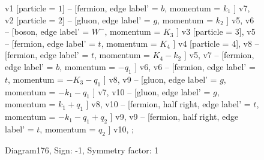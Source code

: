 \documentclass{revtex4}
\begin{document}
\begin{figure}[!htb]
\begin{center}
{    %
v1 [particle = \(1\)] -- [fermion, edge label' = \(b\), momentum = \(k_{1}\) ] v7, 
v2 [particle = \(2\)] -- [gluon, edge label' = \(g\), momentum = \(k_{2}\) ] v5, 
v6 -- [boson, edge label' = \(W^{-}\), momentum = \(K_{3}\) ] v3 [particle = \(3\)], 
v5 -- [fermion, edge label' = \(t\), momentum = \(K_{4}\) ] v4 [particle = \(4\)], 
v8 -- [fermion, edge label' = \(t\), momentum = \(K_{4} - k_{2}\) ] v5, 
v7 -- [fermion, edge label' = \(b\), momentum = \(-q_{1}\) ] v6, 
v6 -- [fermion, edge label' = \(t\), momentum = \(-K_{3} - q_{1}\) ] v8, 
v9 -- [gluon, edge label' = \(g\), momentum = \(-k_{1} - q_{1}\) ] v7, 
v10 -- [gluon, edge label' = \(g\), momentum = \(k_{1} + q_{1}\) ] v8, 
v10 -- [fermion, half right, edge label' = \(t\), momentum = \(-k_{1} - q_{1} + q_{2}\) ] v9, 
v9 -- [fermion, half right, edge label' = \(t\), momentum = \(q_{2}\) ] v10, 
};
\end{center}
\caption{Diagram176, Sign: -1, Symmetry factor: 1}
\end{figure}
\newpage
\end{document}
